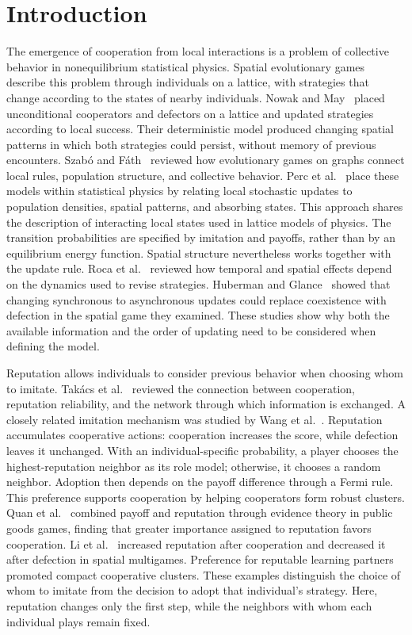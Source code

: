 \documentclass[physics,article,submit,moreauthors]{Definitions/mdpi}
\begin{document}
\section{Introduction}
The emergence of cooperation from local interactions is a problem of collective behavior in nonequilibrium statistical physics. Spatial evolutionary games describe this problem through individuals on a lattice, with strategies that change according to the states of nearby individuals. Nowak and May~\cite{nowak1992} placed unconditional cooperators and defectors on a lattice and updated strategies according to local success. Their deterministic model produced changing spatial patterns in which both strategies could persist, without memory of previous encounters. Szab\'o and F\'ath~\cite{szabo2007} reviewed how evolutionary games on graphs connect local rules, population structure, and collective behavior. Perc et al.~\cite{perc2017} place these models within statistical physics by relating local stochastic updates to population densities, spatial patterns, and absorbing states. This approach shares the description of interacting local states used in lattice models of physics. The transition probabilities are specified by imitation and payoffs, rather than by an equilibrium energy function. Spatial structure nevertheless works together with the update rule. Roca et al.~\cite{roca2009} reviewed how temporal and spatial effects depend on the dynamics used to revise strategies. Huberman and Glance~\cite{huberman1993} showed that changing synchronous to asynchronous updates could replace coexistence with defection in the spatial game they examined. These studies show why both the available information and the order of updating need to be considered when defining the model.

Reputation allows individuals to consider previous behavior when choosing whom to imitate. Tak\'acs et al.~\cite{takacs2021} reviewed the connection between cooperation, reputation reliability, and the network through which information is exchanged. A closely related imitation mechanism was studied by Wang et al.~\cite{wang2012}. Reputation accumulates cooperative actions: cooperation increases the score, while defection leaves it unchanged. With an individual-specific probability, a player chooses the highest-reputation neighbor as its role model; otherwise, it chooses a random neighbor. Adoption then depends on the payoff difference through a Fermi rule. This preference supports cooperation by helping cooperators form robust clusters. Quan et al.~\cite{quan2020} combined payoff and reputation through evidence theory in public goods games, finding that greater importance assigned to reputation favors cooperation. Li et al.~\cite{li2021} increased reputation after cooperation and decreased it after defection in spatial multigames. Preference for reputable learning partners promoted compact cooperative clusters. These examples distinguish the choice of whom to imitate from the decision to adopt that individual's strategy. Here, reputation changes only the first step, while the neighbors with whom each individual plays remain fixed.
\end{document}
